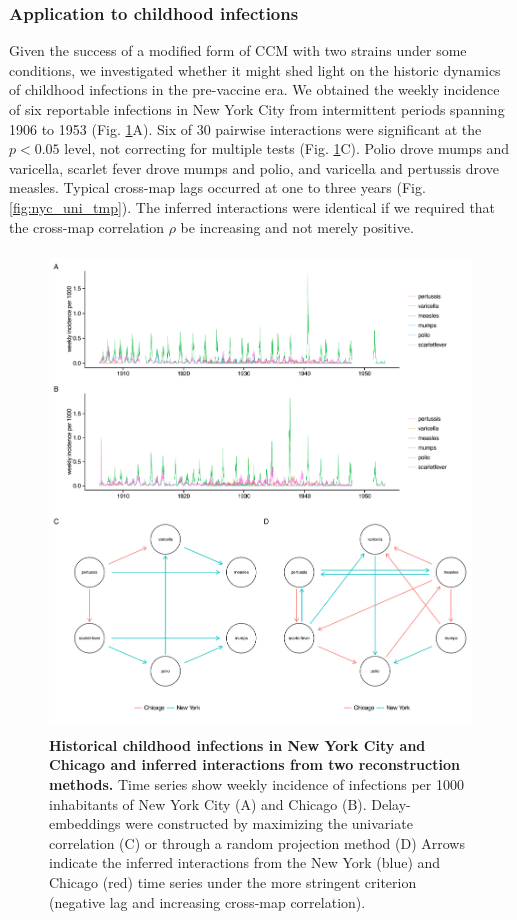 \documentclass[10pt]{article}
\begin{document}
\subsubsection{Application to childhood infections}

Given the success of a modified form of CCM with two strains under some conditions, we investigated whether it might shed light on the historic dynamics of childhood infections in the pre-vaccine era.
We obtained the weekly incidence of six reportable infections in New York City from intermittent periods spanning 1906 to 1953 \cite{vanPanhuis2013} (Fig. \ref{fig:historical_data_tmp}A).
Six of 30 pairwise interactions were significant at the $p<0.05$ level, not correcting for multiple tests (Fig. \ref{fig:historical_data_tmp}C).
Polio drove mumps and varicella, scarlet fever drove mumps and polio, and varicella and pertussis drove measles. 
Typical cross-map lags occurred at one to three years (Fig. \ref{fig:nyc_uni_tmp}).
The inferred interactions were identical if we required that the cross-map correlation $\rho$ be increasing and not merely positive.

\begin{figure}
\begin{center}
  \includegraphics[height=5in]{dataflow/out/fig_cities/fig_cities.pdf}
  \end{center}
    \caption{\textbf{Historical childhood infections in New York City and Chicago and inferred interactions from two reconstruction methods.} Time series show weekly incidence of infections per 1000 inhabitants of New York City (A) and Chicago (B). Delay-embeddings were constructed by maximizing the univariate correlation (C) or through a random projection method (D) Arrows indicate the inferred interactions from the New York (blue) and Chicago (red) time series under the more stringent criterion (negative lag and increasing cross-map correlation).\label{fig:historical_data_tmp}} 
\end{figure}
\end{document}
